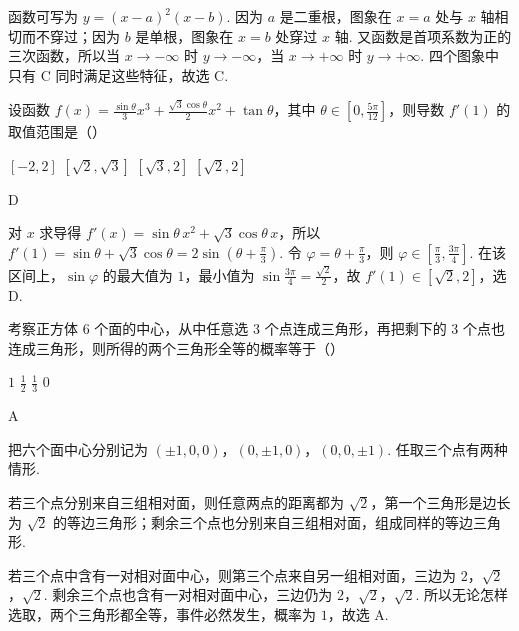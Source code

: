 \begin{solution}
函数可写为 \(y=(x-a)^2(x-b)\). 因为 \(a\) 是二重根，图象在 \(x=a\) 处与 \(x\) 轴相切而不穿过；因为 \(b\) 是单根，图象在 \(x=b\) 处穿过 \(x\) 轴. 又函数是首项系数为正的三次函数，所以当 \(x\to-\infty\) 时 \(y\to-\infty\)，当 \(x\to+\infty\) 时 \(y\to+\infty\). 四个图象中只有 C 同时满足这些特征，故选 C.
\end{solution}

\begin{problem}
设函数 \( f(x) = \frac{\sin \theta}{3} x^3 + \frac{\sqrt{3} \cos \theta}{2} x^2 + \tan \theta \)，其中 \( \theta \in \left[0, \frac{5\pi}{12}\right] \)，则导数 \( f'(1) \) 的取值范围是（\quad）

\choices
    {\([-2, 2]\)}
    {\([\sqrt{2},\sqrt{3}]\)}
    {\([\sqrt{3}, 2]\)}
    {\([\sqrt{2}, 2]\)}
\end{problem}

\begin{answer}
D
\end{answer}

\begin{solution}
对 \(x\) 求导得 \(f'(x)=\sin\theta\,x^2+\sqrt{3}\cos\theta\,x\)，所以 \(f'(1)=\sin\theta+\sqrt{3}\cos\theta=2\sin\left(\theta+\frac{\pi}{3}\right)\). 令 \(\varphi=\theta+\frac{\pi}{3}\)，则 \(\varphi\in\left[\frac{\pi}{3},\frac{3\pi}{4}\right]\). 在该区间上，\(\sin\varphi\) 的最大值为 \(1\)，最小值为 \(\sin\frac{3\pi}{4}=\frac{\sqrt{2}}{2}\)，故 \(f'(1)\in[\sqrt{2},2]\)，选 D.
\end{solution}

\begin{problem}
考察正方体 \(6\) 个面的中心，从中任意选 \(3\) 个点连成三角形，再把剩下的 \(3\) 个点也连成三角形，则所得的两个三角形全等的概率等于（\quad）

\choices
    {\(1\)}
    {\( \frac{1}{2} \)}
    {\( \frac{1}{3} \)}
    {\(0\)}
\end{problem}

\begin{answer}
A
\end{answer}

\begin{solution}
把六个面中心分别记为 \((\pm1,0,0)\)，\((0,\pm1,0)\)，\((0,0,\pm1)\). 任取三个点有两种情形.

若三个点分别来自三组相对面，则任意两点的距离都为 \(\sqrt{2}\)，第一个三角形是边长为 \(\sqrt{2}\) 的等边三角形；剩余三个点也分别来自三组相对面，组成同样的等边三角形.

若三个点中含有一对相对面中心，则第三个点来自另一组相对面，三边为 \(2\)，\(\sqrt{2}\)，\(\sqrt{2}\). 剩余三个点也含有一对相对面中心，三边仍为 \(2\)，\(\sqrt{2}\)，\(\sqrt{2}\). 所以无论怎样选取，两个三角形都全等，事件必然发生，概率为 \(1\)，故选 A.
\end{solution}

